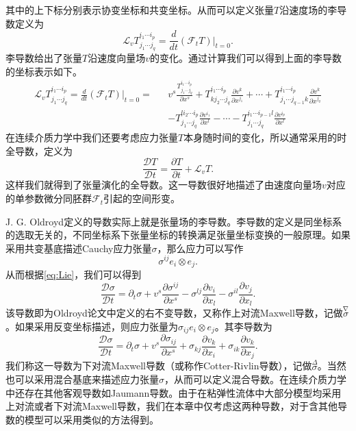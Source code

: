 \documentclass{article}
\begin{document}
其中的上下标分别表示协变坐标和共变坐标。从而可以定义张量$T$沿速度场的李导数定义为
\begin{equation*}
	{\mathcal{L}_v T^{i_1 \cdots i_p}_{j_1 \cdots j_q} =\frac{d}{dt} (\mathcal{F}_t T)} |_{t=0}.
\end{equation*}
李导数给出了张量$T$沿速度向量场$v$的变化。通过计算我们可以得到上面的李导数的坐标表示如下。
\begin{eqnarray} \label{eq:Lie}
	 {\mathcal{L}_v T^{i_1 \cdots i_p}_{j_1 \cdots j_q} = \frac{d}{dt} (\mathcal{F}_t T)} |_{t=0}  = && v^s \frac{T^{i_1 \cdots i_p}_{j_1\cdots j_q}}{\partial x^s} + T^{i_1 \cdots i_p}_{k j_2 \cdots j_q}\frac{\partial v^k}{\partial x^{j_1}} + \cdots + T^{i_1 \cdots i_p}_{j_1\cdots j_{q-1}k}\frac{\partial v^k}{\partial x^{j_q}} 
	\\ && - T^{li_2 \cdots i_p}_{j_1\cdots j_q}\frac{\partial v^{i_1}}{\partial x^l}- \cdots - T^{i_1 \cdots i_{p-1}l}_{j_1\cdots j_q}\frac{\partial v^{i_p}}{\partial x^l} \nonumber
\end{eqnarray}
在连续介质力学中我们还要考虑应力张量$T$本身随时间的变化，所以通常采用的时全导数，定义为
\begin{equation*}
	\frac{\mathcal{D} T}{\mathcal{D}t} = \frac{\partial T}{\partial t} + \mathcal{L}_v T. 
\end{equation*}
这样我们就得到了张量演化的全导数。这一导数很好地描述了由速度向量场$v$对应的单参数微分同胚群$\mathcal{F}_t$引起的空间形变\cite{}。

J. G. Oldroyd定义的导数实际上就是张量场的李导数。李导数的定义是同坐标系的选取无关的，不同坐标系下张量坐标的转换满足张量坐标变换的一般原理。如果采用共变基底描述Cauchy应力张量$\sigma$，那么应力可以写作
\begin{equation*}
	\sigma^{ij} e_i \otimes e_j.
\end{equation*}
从而根据\eqref{eq:Lie}，我们可以得到
\begin{equation}
	\frac{\mathcal{D} \sigma}{\mathcal{D}t} = \partial_t \sigma + v^s \frac{\partial \sigma^{ij}}{\partial x^s} - \sigma^{lj} \frac{\partial v_i}{\partial x_l} -  \sigma^{il} \frac{\partial v_j}{\partial x_l}. 
\end{equation}
该导数即为Oldroyd论文中定义的右不变导数，又称作上对流Maxwell导数，记做$\stackrel{\nabla} \sigma$。如果采用反变坐标描述，则应力张量为$\sigma_{ij} e_i \otimes e_j$。其李导数为
\begin{equation}
	\frac{\mathcal{D} \sigma}{\mathcal{D}t} = \partial_t \sigma + v^s \frac{\partial \sigma_{ij}}{\partial x^s} + \sigma_{kj} \frac{\partial v_k}{\partial x_i} +  \sigma_{ik} \frac{\partial v_k}{\partial x_j}. 
\end{equation}
我们称这一导数为下对流Maxwell导数（或称作Cotter-Rivlin导数），记做$\stackrel{\Delta} \sigma$\cite{}。当然也可以采用混合基底来描述应力张量$\sigma$，从而可以定义混合导数。在连续介质力学中还存在其他客观导数如Jaumann导数。由于在粘弹性流体中大部分模型均采用上对流或者下对流Maxwell导数，我们在本章中仅考虑这两种导数，对于含其他导数的模型可以采用类似的方法得到。
\end{document}
